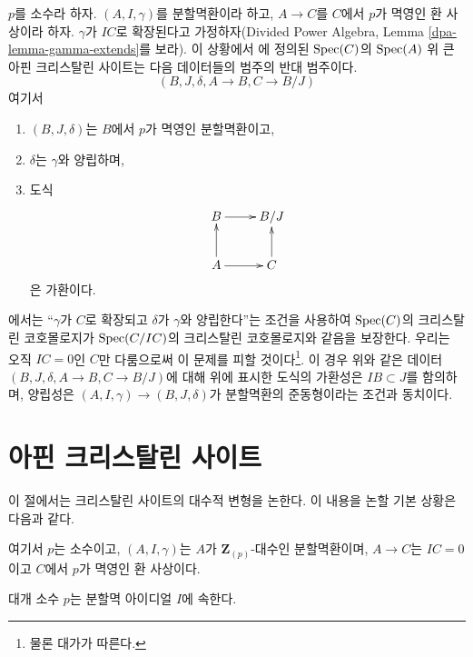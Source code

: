 \noindent
$p$를 소수라 하자. $(A, I, \gamma)$를 분할멱환이라 하고,
$A \to C$를 $C$에서 $p$가 멱영인 환 사상이라 하자.
$\gamma$가 $IC$로 확장된다고 가정하자(Divided Power Algebra,
Lemma \ref{dpa-lemma-gamma-extends}를 보라).
이 상황에서 \cite{Berthelot}에 정의된
$\mathop{\mathrm{Spec}}(C)$의 $\mathop{\mathrm{Spec}}(A)$ 위 큰 아핀 크리스탈린 사이트는
다음 데이터들의 범주의 반대 범주이다.
$$
(B, J, \delta, A \to B, C \to B/J)
$$
여기서
\begin{enumerate}
\item $(B, J, \delta)$는 $B$에서 $p$가 멱영인 분할멱환이고,
\item $\delta$는 $\gamma$와 양립하며,
\item 도식
$$
\xymatrix{
B \ar[r] & B/J \\
A \ar[u] \ar[r] & C \ar[u]
}
$$
은 가환이다.
\end{enumerate}
\cite{Berthelot}에서는 ``$\gamma$가 $C$로 확장되고 $\delta$가
$\gamma$와 양립한다''는 조건을 사용하여 $\mathop{\mathrm{Spec}}(C)$의
크리스탈린 코호몰로지가 $\mathop{\mathrm{Spec}}(C/IC)$의 크리스탈린 코호몰로지와
같음을 보장한다. 우리는 오직 $IC = 0$인 $C$만 다룸으로써
이 문제를 피할 것이다\footnote{물론 대가가 따른다.}.
이 경우 위와 같은 데이터 $(B, J, \delta, A \to B, C \to B/J)$에 대해
위에 표시한 도식의 가환성은 $IB \subset J$를 함의하며,
양립성은 $(A, I, \gamma) \to (B, J, \delta)$가 분할멱환의
준동형이라는 조건과 동치이다.




\section{아핀 크리스탈린 사이트}
\label{section-affine-site}

\noindent
이 절에서는 크리스탈린 사이트의 대수적 변형을 논한다.
이 내용을 논할 기본 상황은 다음과 같다.

\begin{situation}
\label{situation-affine}
여기서 $p$는 소수이고, $(A, I, \gamma)$는 $A$가
$\mathbf{Z}_{(p)}$-대수인 분할멱환이며, $A \to C$는
$IC = 0$이고 $C$에서 $p$가 멱영인 환 사상이다.
\end{situation}

\noindent
대개 소수 $p$는 분할멱 아이디얼 $I$에 속한다.

